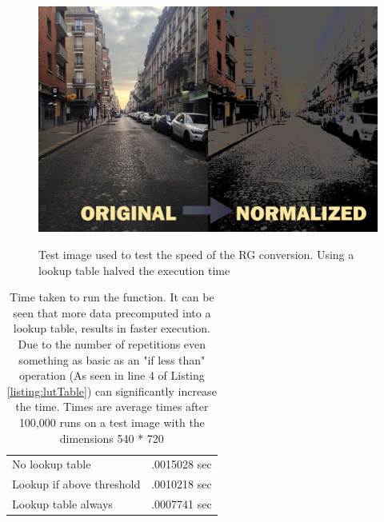 \begin{multicols}{2}
	\begin{figure}[H]
	\includegraphics[width=1\linewidth]{figure/Analysis/Normalized.png}
	\label{rgConversion}
	\caption{Test image used to test the speed of the  RG conversion. Using a lookup table halved the execution time}
	\end{figure}

    \columnbreak
	\begin{table}[H]
		\centering
		\caption{Time taken to run the function. It can be seen that more data precomputed into a lookup table, results in faster execution. Due to the number of repetitions even something as basic as an "if less than" operation (As seen in line 4 of Listing \ref{listing:lutTable}) can significantly increase the time. Times are average times after 100,000 runs on a test image with the dimensions 540 * 720}
		\begin{tabular}{ l | l }
			\hline			
			No lookup table & .0015028 sec\\
			Lookup if above threshold & .0010218 sec\\
			Lookup table always& .0007741 sec\\
			\hline 
		\end{tabular}
	\label{table:rgConvSpeed}
	\end{table}
\end{multicols}


